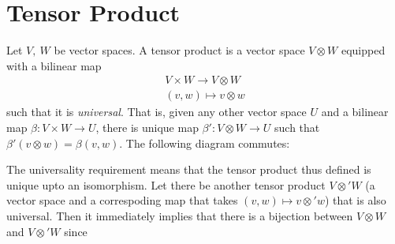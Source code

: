 \appendix
\chapter{Tensor Product}
\label{cha:tensor_product}

Let $V,\ W$ be vector spaces. A tensor product is a vector space $V\otimes W$ equipped with a bilinear map
\begin{align}
    V\times W \to V\otimes W\\
    (v,w) \mapsto v\otimes w
\end{align}
such that it is \emph{universal}. That is, given any other vector space $U$ and a bilinear map $\beta: V\times W\to U$, there is unique map $\beta': V\otimes W \to U$ such that $\beta'(v\otimes w) = \beta(v,w)$. The following diagram commutes:

\begin{center}
\end{center}
The universality requirement means that the tensor product thus defined is unique upto an isomorphism. Let there be another tensor product $V\otimes' W$ (a vector space and a correspoding map that takes $(v,w)\mapsto v\otimes' w$) that is also universal. Then it immediately implies that there is a bijection between $V\otimes W$ and $V\otimes' W$ since
\begin{center}
\end{center}

